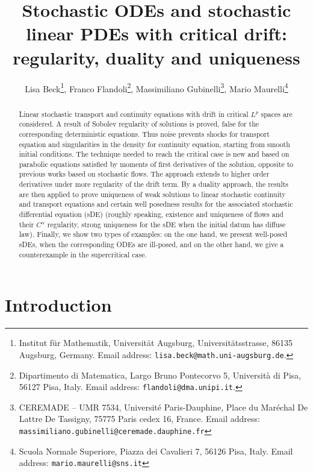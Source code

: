 \documentclass[a4paper,10pt]{article}
\begin{document}
\title{Stochastic ODEs and stochastic linear PDEs with critical drift: regularity, duality and uniqueness}
\author{Lisa Beck\footnote{Institut f\"ur Mathematik, Universit\"at Augsburg, Universit\"atsstrasse, 86135 Augsburg, Germany. Email address: {\tt lisa.beck@math.uni-augsburg.de}.}, 
Franco Flandoli\footnote{Dipartimento di Matematica, Largo Bruno Pontecorvo 5, Universit\`a 
  di Pisa, 56127 Pisa, Italy. Email address: {\tt flandoli@dma.unipi.it}.}, 
Massimiliano Gubinelli\footnote{CEREMADE -- UMR 7534, Universit\'e Paris-Dauphine,
Place du Mar\'echal De Lattre De Tassigny, 75775 Paris cedex 16, France. Email address: {\tt massimiliano.gubinelli@ceremade.dauphine.fr}}, Mario Maurelli\footnote{Scuola Normale Superiore, Piazza dei Cavalieri 7, 56126 Pisa, Italy. Email address: {\tt mario.maurelli@sns.it}}}
\date{}
\maketitle

\begin{abstract}
Linear stochastic transport and continuity equations with drift in critical 
$L^{p}$ spaces are considered. A result of Sobolev regularity of solutions is
proved, false for the corresponding deterministic equations. Thus noise
prevents shocks for transport equation and singularities in the density for
continuity equation, starting from smooth initial conditions. The technique needed to
reach the critical case is new and based on parabolic equations satisfied by
moments of first derivatives of the solution, opposite to previous works
based on stochastic flows. The approach extends to higher order derivatives
under more regularity of the drift term. By a duality approach, the 
results are then applied to prove uniqueness of weak solutions to linear stochastic
continuity and transport equations and certain well posedness results for
the associated stochastic differential equation (sDE) (roughly speaking, existence and uniqueness of flows and their $C^\alpha$ regularity, strong uniqueness for the sDE when the initial datum has diffuse law). Finally, we show two types of examples: on the one hand, we present well-posed sDEs, when the corresponding ODEs are ill-posed, and on the other hand, we give a counterexample in the supercritical case.
\end{abstract}

\section{Introduction}
\end{document}
